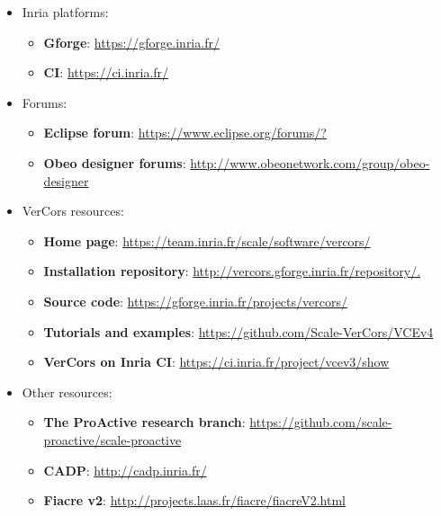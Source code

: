 \documentclass[12pt]{article}
\begin{document}
\begin{itemize}
\item
Inria platforms:
\begin{itemize}
\item
\textbf{Gforge}:  \url{https://gforge.inria.fr/}
\item
\textbf{CI}: \url{https://ci.inria.fr/}
\end{itemize}

\item
Forums:
\begin{itemize}
\item
\textbf{Eclipse forum}: \url{https://www.eclipse.org/forums/?}
\item
\textbf{Obeo designer forums}: \url{http://www.obeonetwork.com/group/obeo-designer}
\end{itemize}

\item
VerCors resources:
\begin{itemize}
\item
\textbf{Home page}: \url{https://team.inria.fr/scale/software/vercors/}
\item
\textbf{Installation repository}: \url{http://vercors.gforge.inria.fr/repository/.}
\item
\textbf{Source code}: \url{https://gforge.inria.fr/projects/vercors/}
\item
\textbf{Tutorials and examples}: \url{https://github.com/Scale-VerCors/VCEv4}
\item
\textbf{VerCors on Inria CI}: \url{https://ci.inria.fr/project/vcev3/show}
\end{itemize}

\item
Other resources:
\begin{itemize}
\item
\textbf{The ProActive research branch}: \url{https://github.com/scale-proactive/scale-proactive}
\item
\textbf{CADP}: \url{http://cadp.inria.fr/}
\item
\textbf{Fiacre v2}: \url{http://projects.laas.fr/fiacre/fiacreV2.html}
\end{itemize}

\end{itemize}
\end{document}
